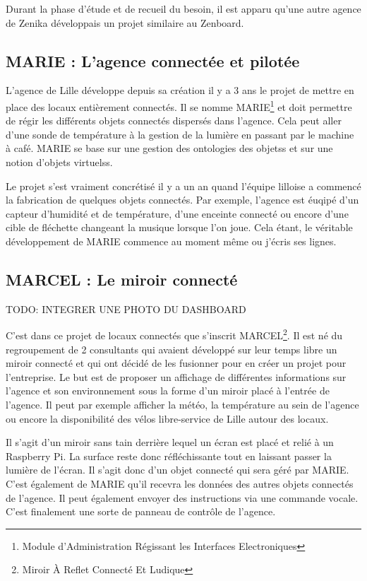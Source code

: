 Durant la phase d'étude et de recueil du besoin\footnotemark, il est apparu qu'une autre agence de Zenika développais un projet similaire au Zenboard.\\


\subsection{MARIE : L'agence connectée et pilotée}

L'agence de Lille développe depuis sa création il y a 3 ans le projet de mettre en place des locaux entièrement connectés. Il se nomme MARIE\footnote{Module d'Administration Régissant les Interfaces Electroniques} et doit permettre de régir les différents objets connectés dispersés dans l'agence. Cela peut aller d'une sonde de température à la gestion de la lumière en passant par le machine à café. MARIE se base sur une gestion des \glspl{ontologies des objets} et sur une notion d'\glspl{objets virtuels}.

Le projet s'est vraiment concrétisé il y a un an quand l'équipe lilloise a commencé la fabrication de quelques objets connectés. Par exemple, l'agence est éuqipé d'un capteur d'humidité et de température, d'une enceinte connecté ou encore d'une cible de fléchette changeant la musique lorsque l'on joue. Cela étant, le véritable développement de MARIE commence au moment même ou j'écris ses lignes.

\subsection{MARCEL : Le miroir connecté}

TODO: INTEGRER UNE PHOTO DU DASHBOARD

C'est dans ce projet de locaux connectés que s'inscrit MARCEL\footnote{Miroir À Reflet Connecté Et Ludique}. Il est né du regroupement de 2 consultants qui avaient développé sur leur temps libre un miroir connecté et qui ont décidé de les fusionner pour en créer un projet pour l'entreprise. Le but est de proposer un affichage de différentes informations sur l'agence et son environnement sous la forme d'un miroir placé à l'entrée de l'agence. Il peut par exemple afficher la météo, la température au sein de l'agence ou encore la disponibilité des vélos libre-service de Lille autour des locaux.

Il s'agit d'un miroir sans tain derrière lequel un écran est placé et relié à un Raspberry Pi\footnotemark. La surface reste donc réfléchissante tout en laissant passer la lumière de l'écran. Il s'agit donc d'un objet connecté qui sera géré par MARIE. C'est également de MARIE qu'il recevra les données des autres objets connectés de l'agence. Il peut également envoyer des instructions via une commande vocale. C'est finalement une sorte de panneau de contrôle de l'agence.

